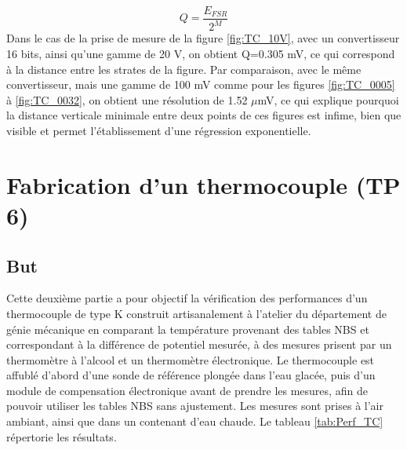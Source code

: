 \documentclass[11pt,twoside]{article}
\numberwithin{figure}{section}
\begin{document}
\begin{equation}
	Q = \frac{E_{FSR}}{2^{M}} \label{eq:quant}
\end{equation}
Dans le cas de la prise de mesure de la figure \ref{fig:TC_10V}, avec un convertisseur 16 bits, ainsi qu'une gamme de 20 V, on obtient Q=0.305 mV, ce qui correspond à la distance entre les strates de la figure. Par comparaison, avec le même convertisseur, mais une gamme de 100 mV comme pour les figures \ref{fig:TC_0005} à \ref{fig:TC_0032}, on obtient une résolution de 1.52 $\mu$mV, ce qui explique pourquoi la distance verticale minimale entre deux points de ces figures est infime, bien que visible et permet l'établissement d'une régression exponentielle.
\newpage{}
\section{Fabrication d’un thermocouple (TP 6)}
\thispagestyle{empty}

\subsection{But}
Cette deuxième partie a pour objectif la vérification des performances d'un thermocouple de type K construit artisanalement à l'atelier du département de génie mécanique en comparant la température provenant des tables NBS et correspondant à la différence de potentiel mesurée, à des mesures prisent par un thermomètre à l'alcool et un thermomètre électronique. Le thermocouple est affublé d'abord d'une sonde de référence plongée dans l'eau glacée, puis d'un module de compensation électronique avant de prendre les mesures, afin de pouvoir utiliser les tables NBS sans ajustement. Les mesures sont prises à l'air ambiant, ainsi que dans un contenant d'eau chaude. Le tableau \ref{tab:Perf_TC} répertorie les résultats.
\end{document}
